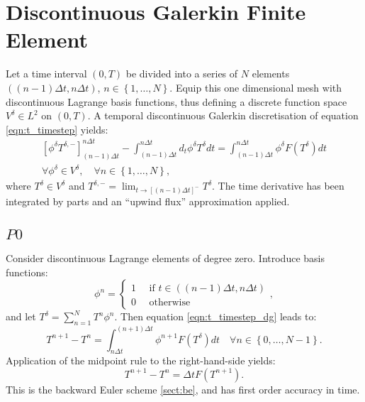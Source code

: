 \documentclass[a4paper]{book}
\begin{document}
\section{Discontinuous Galerkin Finite Element}

Let a time interval $(0, T)$ be divided into a series of $N$ elements
$( (n - 1) \Delta t, n \Delta t )$,
$n \in \left\{ 1, \ldots, N \right\}$. Equip this one dimensional mesh with
discontinuous Lagrange basis functions, thus defining a discrete function
space $V^\delta \in L^2$ on $(0, T)$. A temporal discontinuous Galerkin
discretisation of equation \eqref{eqn:t_timestep} yields:
\begin{align}\label{eqn:t_timestep_dg}
  \left[ \phi^\delta T^{\delta,-} \right]_{(n - 1) \Delta t}^{n \Delta t}
    - \int_{(n - 1) \Delta t}^{n \Delta t} d_t \phi^\delta T^\delta dt
    = \int_{(n - 1) \Delta t}^{n \Delta t} \phi^\delta F \left( T^\delta \right) dt \nonumber \\
    \forall \phi^\delta \in V^\delta, \quad \forall n \in \left\{ 1, \ldots, N \right\},
\end{align}
where $T^\delta \in V^\delta$ and
$T^{\delta,-} = \lim_{t \rightarrow \left[ (n - 1) \Delta t \right]^{-}} T^{\delta}$.
The time derivative has been integrated by parts and an ``upwind flux''
approximation applied.

\subsection{$P0$}

Consider discontinuous Lagrange elements of degree zero. Introduce basis
functions:
\begin{equation}
  \phi^n = \left\{ \begin{array}{l} 1 \quad \textrm{ if } t \in \left( (n - 1) \Delta t, n \Delta t \right) \\
                                    0 \quad \textrm{ otherwise}\end{array} \right. ,
\end{equation}
and let $T^\delta = \sum_{n = 1}^N T^n \phi^n$. Then equation
\eqref{eqn:t_timestep_dg} leads to:
\begin{equation}
  T^{n + 1} - T^n
    = \int_{n \Delta t}^{(n + 1) \Delta t} \phi^{n + 1} F \left( T^\delta \right) dt \quad \forall n \in \left\{ 0, \ldots, N - 1 \right\}.
\end{equation}
Application of the midpoint rule to the right-hand-side yields:
\begin{equation}
  T^{n + 1} - T^n = \Delta t F \left( T^{n + 1} \right).
\end{equation}
This is the backward Euler scheme \ref{sect:be}, and has first order accuracy
in time.
\end{document}
